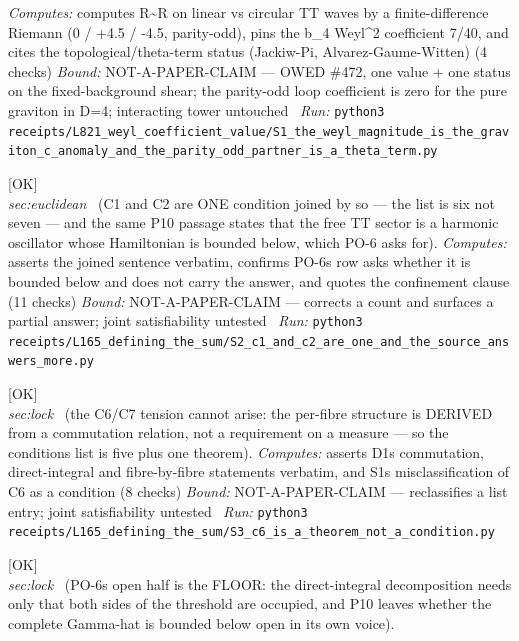 \begin{description}
\emph{Computes:} computes R\textasciitilde{}R on linear vs circular TT waves by a finite-difference Riemann (0 / +4.5 / -4.5, parity-odd), pins the b\_4 Weyl\textasciicircum{}2 coefficient 7/40, and cites the topological/theta-term status (Jackiw-Pi, Alvarez-Gaume-Witten) (4 checks)
 \emph{Bound:} NOT-A-PAPER-CLAIM --- OWED \#472, one value + one status on the fixed-background shear; the parity-odd loop coefficient is zero for the pure graviton in D=4; interacting tower untouched
\ \emph{Run:} \texttt{python3 receipts/L821\_weyl\_coefficient\_value/S1\_the\_weyl\_magnitude\_is\_the\_graviton\_c\_anomaly\_and\_the\_parity\_odd\_partner\_is\_a\_theta\_term.py}
\item[\label{rcpt:S2_c1_and_c2_are_one_and_the_source_answers_more}\textbf{}\quad\texttt{S2\_c1\_and\_c2\_are\_one\_and\_the\_source\_answers\_more}]\hfill\textsf{[OK]}\\
\textit{sec:euclidean} \ (C1 and C2 are ONE condition joined by so --- the list is six not seven --- and the same P10 passage states that the free TT sector is a harmonic oscillator whose Hamiltonian is bounded below, which PO-6 asks for). 
\emph{Computes:} asserts the joined sentence verbatim, confirms PO-6s row asks whether it is bounded below and does not carry the answer, and quotes the confinement clause (11 checks)
 \emph{Bound:} NOT-A-PAPER-CLAIM --- corrects a count and surfaces a partial answer; joint satisfiability untested
\ \emph{Run:} \texttt{python3 receipts/L165\_defining\_the\_sum/S2\_c1\_and\_c2\_are\_one\_and\_the\_source\_answers\_more.py}
\item[\label{rcpt:S3_c6_is_a_theorem_not_a_condition}\textbf{}\quad\texttt{S3\_c6\_is\_a\_theorem\_not\_a\_condition}]\hfill\textsf{[OK]}\\
\textit{sec:lock} \ (the C6/C7 tension cannot arise: the per-fibre structure is DERIVED from a commutation relation, not a requirement on a measure --- so the conditions list is five plus one theorem). 
\emph{Computes:} asserts D1s commutation, direct-integral and fibre-by-fibre statements verbatim, and S1s misclassification of C6 as a condition (8 checks)
 \emph{Bound:} NOT-A-PAPER-CLAIM --- reclassifies a list entry; joint satisfiability untested
\ \emph{Run:} \texttt{python3 receipts/L165\_defining\_the\_sum/S3\_c6\_is\_a\_theorem\_not\_a\_condition.py}
\item[\label{rcpt:S4_the_open_half_is_the_floor}\textbf{}\quad\texttt{S4\_the\_open\_half\_is\_the\_floor}]\hfill\textsf{[OK]}\\
\textit{sec:lock} \ (PO-6s open half is the FLOOR: the direct-integral decomposition needs only that both sides of the threshold are occupied, and P10 leaves whether the complete Gamma-hat is bounded below open in its own voice). 

\end{description}

